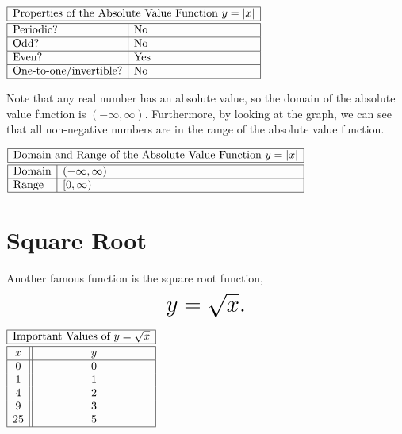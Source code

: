 \documentclass[nooutcomes]{ximera}
\begin{document}
\begin{center}
$
\begin{array}{|l|l|}
 \hline
 \multicolumn{2}{|c|}{\text{\normalfont Properties of the Absolute Value Function } y=|x|} \\
\hline
 \hline
\text{Periodic?} & \text{No} \\ \hline
\text{Odd?} & \text{No} \\ \hline
\text{Even?} & \text{Yes } \\ \hline
\text{One-to-one/invertible?} & \text{No}\\ \hline
\end{array}
$
\end{center}

Note that any real number has an absolute value, so the domain of the absolute value function is $(-\infty, \infty)$. Furthermore, by looking at the graph, we can see that all non-negative numbers are in the range of the absolute value function.

\begin{center}
$
\begin{array}{|l|l|}
 \hline
 \multicolumn{2}{|c|}{\text{\normalfont Domain and Range of the Absolute Value Function } y=|x|} \\
\hline
 \hline
\text{Domain} & (-\infty, \infty) \\ \hline
\text{Range} & [0, \infty)\\ \hline
\end{array}
$
\end{center}

\newpage


\section{Square Root}
Another famous function is the square root function, $$ \mbox{\huge $y=\sqrt{x}.$}$$ 

\begin{image}
\end{image}


\begin{center}
\(
\begin{array}{ |c || c|  }
 \hline
 \multicolumn{2}{|c|}{\text{\normalfont Important Values of } y=\sqrt{x}} \\
\hline
 \hline
 x & y\\
 \hline
 0&0\\
 1&1\\
 4&2\\
 9&3\\
 25&5\\
 \hline
\end{array}
\)
\end{center}
\end{document}
